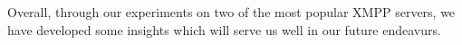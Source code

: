 \documentclass[a4paper, twocolumn]{article}
\begin{document}
Overall, through our experiments on two of the most popular XMPP servers, we have developed some insights which will serve us well in our future endeavurs. 

\end{document}
